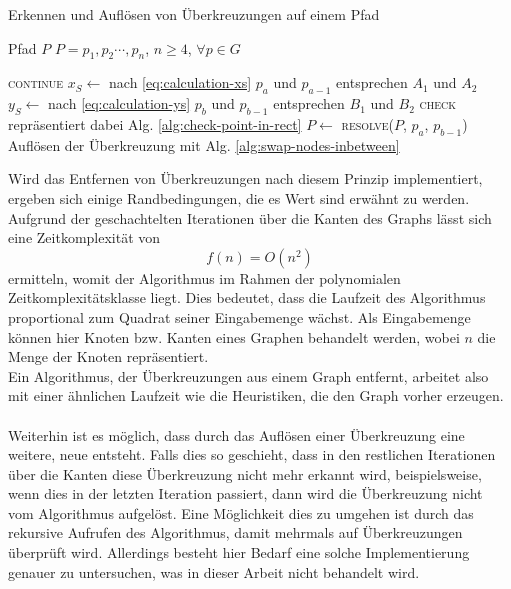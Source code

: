 \begin{algorithm}
    \caption{Erkennen und Auflösen von Überkreuzungen auf einem Pfad}
    \label{alg:handle-crossover}
    \begin{algorithmic}[1]
        \Require Pfad $P$
        \Require $P=p_1,p_2\cdots,p_n$, $n \geq 4$, $\forall p \in G$
        
                    \State \textsc{continue}
                \EndIf
                \State $x_S \gets $ nach \vref{eq:calculation-xs}
                \Comment $p_a$ und $p_{a-1}$ entsprechen $A_1$ und $A_2$ 
                \State $y_S \gets $ nach \vref{eq:calculation-ys}
                \Comment $p_b$ und $p_{b-1}$ entsprechen $B_1$ und $B_2$ 
                \Comment \textsc{check} repräsentiert dabei \ac{Alg.} \vref{alg:check-point-in-rect}
                    \State $P \gets $ \textsc{resolve}($P$, $p_a$, $p_{b-1}$)
                    \Comment Auflösen der Überkreuzung mit \ac{Alg.} \vref{alg:swap-nodes-inbetween}
                \EndIf
            \EndFor
        \EndFor
    \end{algorithmic}
\end{algorithm}

Wird das Entfernen von Überkreuzungen nach diesem Prinzip implementiert, ergeben sich einige Randbedingungen, die es Wert sind erwähnt zu werden.
Aufgrund der geschachtelten Iterationen über die Kanten des Graphs lässt sich eine Zeitkomplexität von $$f(n) = O(n^2)$$ ermitteln, womit der Algorithmus im Rahmen der polynomialen Zeitkomplexitätsklasse liegt. 
Dies bedeutet, dass die Laufzeit des Algorithmus proportional zum Quadrat seiner Eingabemenge wächst.
Als Eingabemenge können hier Knoten bzw. Kanten eines Graphen behandelt werden, wobei $n$ die Menge der Knoten repräsentiert.
\\
Ein Algorithmus, der Überkreuzungen aus einem Graph entfernt, arbeitet also mit einer ähnlichen Laufzeit wie die Heuristiken, die den Graph vorher erzeugen.
\\\\
Weiterhin ist es möglich, dass durch das Auflösen einer Überkreuzung eine weitere, neue entsteht.
Falls dies so geschieht, dass in den restlichen Iterationen über die Kanten diese Überkreuzung nicht mehr erkannt wird, beispielsweise, wenn dies in der letzten Iteration passiert, dann wird die Überkreuzung nicht vom Algorithmus aufgelöst.
Eine Möglichkeit dies zu umgehen ist durch das rekursive Aufrufen des Algorithmus, damit mehrmals auf Überkreuzungen überprüft wird.
Allerdings besteht hier Bedarf eine solche Implementierung genauer zu untersuchen, was in dieser Arbeit nicht behandelt wird.
